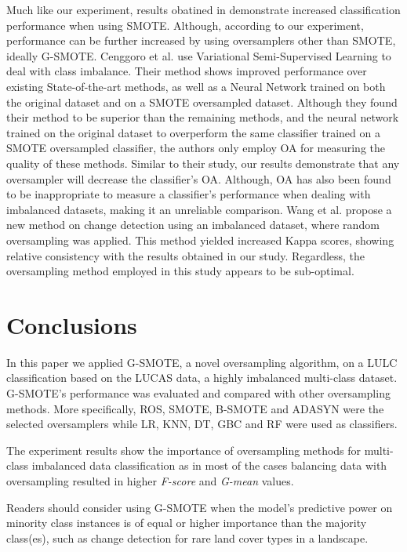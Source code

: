 \documentclass[remotesensing,article,submit,moreauthors,pdftex]{Definitions/mdpi}
\begin{document}
Much like our experiment, results obatined in \cite{Feng2019} demonstrate
increased classification performance when using SMOTE. Although, according to
our experiment, performance can be further increased by using oversamplers other
than SMOTE, ideally G-SMOTE. Cenggoro et al. \cite{Cenggoro2018} use Variational
Semi-Supervised Learning to deal with class imbalance. Their method shows
improved performance over existing State-of-the-art methods, as well as a Neural
Network trained on both the original dataset and on a SMOTE oversampled dataset.
Although they found their method to be superior than the remaining methods, and
the neural network trained on the original dataset to overperform the same
classifier trained on a SMOTE oversampled classifier, the authors only employ OA
for measuring the quality of these methods. Similar to their study, our results
demonstrate that any oversampler will decrease the classifier's OA. Although, OA
has also been found to be inappropriate to measure a classifier's performance
when dealing with imbalanced datasets, making it an unreliable comparison. Wang
et al. \cite{Wang2019} propose a new method on change detection using an
imbalanced dataset, where random oversampling was applied. This method yielded
increased Kappa scores, showing relative consistency with the results obtained
in our study. Regardless, the oversampling method employed in this study appears
to be sub-optimal.

\section{Conclusions}

In this paper we applied G-SMOTE, a novel oversampling algorithm, on a LULC
classification based on the LUCAS data, a highly imbalanced multi-class dataset.
G-SMOTE's performance was evaluated and compared with other oversampling
methods. More specifically, ROS, SMOTE, B-SMOTE and ADASYN were the selected
oversamplers while LR, KNN, DT, GBC and RF were used as classifiers.

The experiment results show the importance of oversampling methods for
multi-class imbalanced data classification as in most of the cases balancing
data with oversampling resulted in higher \textit{F-score} and \textit{G-mean}
values.

Readers should consider using G-SMOTE when the model’s predictive power on
minority class instances is of equal or higher importance than the majority
class(es), such as change detection for rare land cover types in a landscape.
\end{document}
